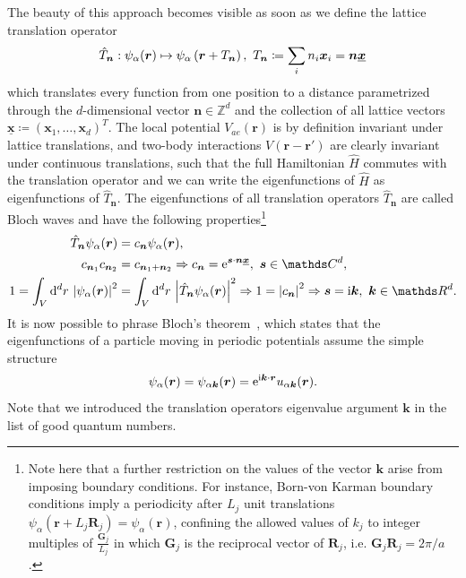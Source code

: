 The beauty of this approach becomes visible as soon as we define the lattice translation operator
\begin{align}
    \hat T_{\bm n} : \psi_\alpha({\bm r}) \mapsto \psi_\alpha\left( {\bm r}+T_{\bm n} \right),\ T_{\bm n}\coloneqq\sum_i n_i {\bm x}_i={\bm n}\underline{\bm x}
\end{align}
which translates every function from one position to a distance parametrized through the $d$-dimensional vector ${\bm n}\in\mathds Z^d$ and the collection of all lattice vectors $\underline{\bm x}\coloneqq ({\bm x}_1,\dots,{\bm x}_d)^T$.
The local potential $V_{ae}({\bm r})$ is by definition invariant under lattice translations, and two-body interactions $V({\bm r}-{\bm r'})$ are clearly invariant under continuous translations, such that the full Hamiltonian $\hat H$ commutes with the translation operator and we can write the eigenfunctions of $\hat H$ as eigenfunctions of $\hat T_{\bm n}$.
The eigenfunctions of all translation operators $\hat T_{\bm n}$ are called Bloch waves and have the following properties\footnote{Note here that a further restriction on the values of the vector ${\bm k}$ arise from imposing boundary conditions. For instance, Born-von Karman boundary conditions imply a periodicity after $L_j$ unit translations $\psi_\alpha({\bm r}+ L_j{\bm R}_j)=\psi_\alpha({\bm r})$, confining the allowed values of $k_j$ to integer multiples of $\frac{\bm G_j}{L_j}$ in which $\bm G_j$ is the reciprocal vector of ${\bm R}_j$, i.e. ${\bm G}_j {\bm R}_j = 2\pi/a$.}
\begin{align}
    \hat T_{\bm n}\psi_{\alpha}({\bm r}) &= c_{\bm n}\psi_{\alpha}({\bm r}),\\
    c_{{\bm n}_1}c_{{\bm n}_2} &= c_{{\bm n}_1+{\bm n}_2} \Rightarrow c_{\bm n} = \re^{{\bm s}\cdot{\bm n}\underline{\bm x}},\ {\bm s}\in\mathds C^d,\\
    1=\int_V\rd^dr\,\abs{\psi_{\alpha}({\bm r})}^2 &= \int_V\rd^dr\,\abs{\hat T_{\bm n}\psi_{\alpha}({\bm r})}^2 \Rightarrow 1=\abs{c_{\bm n}}^2 \Rightarrow {\bm s}=\ri{\bm k},\ {\bm k}\in\mathds R^d.
\end{align}
It is now possible to phrase Bloch's theorem~\cite{Bloch1929}, which states that the eigenfunctions of a particle moving in periodic potentials assume the simple structure
\begin{align}
    \psi_\alpha({\bm r}) = \psi_{\alpha{\bm k}}({\bm r}) = \mathrm e^{\mathrm i{\bm k}\cdot {\bm r}}u_{\alpha{\bm k}}({\bm r}).
    \label{eq:bloch_theorem}
\end{align}
Note that we introduced the translation operators eigenvalue argument $\bm k$ in the list of good quantum numbers.

